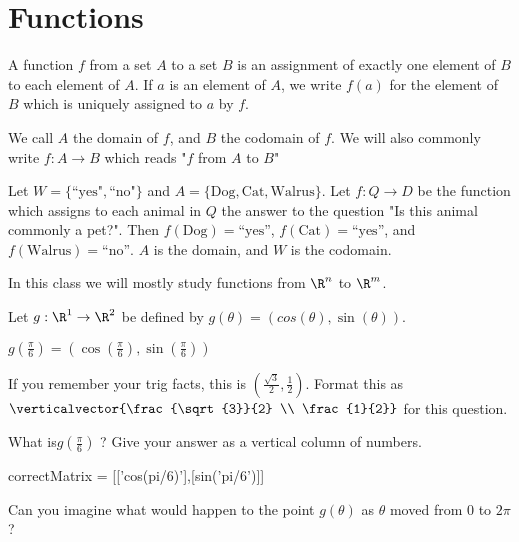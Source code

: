 
\section{Functions}

\begin{definition}
A function $f$ from a set $A$ to a set $B$ is an assignment of exactly one element of $B$ to each element of $A$.  If $a$ is an element of $A$, we write $f(a)$ for the element of 
$B$ which is uniquely assigned to $a$ by $f$. 
\end{definition}

We call $A$ the domain of $f$, and $B$ the codomain of $f$.  We will also commonly write $f:A \to B$ which reads "$f$ from $A$ to $B$"

\begin{example}
Let  $W =\{ \text{``yes"},\text{``no"}\}$ and $A = \{ \text{Dog}, \text{Cat}, \text{Walrus}\}$.  Let $f:Q \to D$ be the function which assigns to each animal in $Q$ the answer to the question "Is this animal commonly a pet?".
Then $f(\text{Dog}) = \text{``yes''}$, $f(\text{Cat}) = \text{``yes''}$, and $f(\text{Walrus}) = \text{``no''}$.  $A$ is the domain, and $W$ is the codomain. 
\end{example}

In this class we will mostly study functions  from $\R^n$ to $\R^m$.

\begin{question}
	Let $g:\R^1 \to \R^2$ be defined by $g(\theta) = (cos(\theta),\sin(\theta))$.
	\begin{solution}
	\begin{hint}
		$g(\frac{\pi}{6}) = (\cos(\frac{\pi}{6}),\sin(\frac{\pi}{6}))$
	\end{hint}
	\begin{hint}
		If you remember your trig facts, this is $(\frac{\sqrt{3}}{2},\frac{1}{2})$.  Format this as $\verticalvector{\frac{\sqrt{3}}{2} \\ \frac{1}{2}}$ for this question.
	\end{hint}
	What is$g(\frac{\pi}{6})$ ?  Give your answer as a vertical column of numbers.
	\begin{matrix-answer}
		correctMatrix = [['cos(pi/6)'],[sin('pi/6')]]
	\end{matrix-answer}
	\end{solution}

	Can you imagine what would happen to the point $g(\theta)$ as $\theta$ moved from $0$ to $2\pi$?
\end{question}


